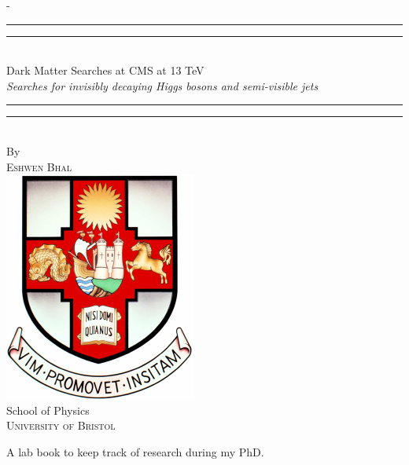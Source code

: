 \documentclass[a4paper,12pt,leqno,openbib,oldfontcommands,oneside]{memoir} %
\begin{document}
\frontmatter
{}

\begin{titlingpage}
  \begin{SingleSpace}
  \calccentering{\unitlength} 
  \begin{adjustwidth*}{\unitlength}{-\unitlength}
  \vspace*{13mm}
  \begin{center}
  \rule[0.5ex]{\linewidth}{2pt}\vspace*{-\baselineskip}\vspace*{3.2pt}
  \rule[0.5ex]{\linewidth}{1pt}\\[\baselineskip]
  {\HUGE Dark Matter Searches at CMS at 13 TeV}\\[4mm] %
  {\Large \textit{Searches for invisibly decaying Higgs bosons and semi-visible jets}}\\ %
  \rule[0.5ex]{\linewidth}{1pt}\vspace*{-\baselineskip}\vspace{3.2pt}
  \rule[0.5ex]{\linewidth}{2pt}\\
  \vspace{6.5mm}
  {\large By}\\
  \vspace{6.5mm}
  {\large\textsc{Eshwen Bhal}}\\  %
  \vspace{11mm}
  \includegraphics[scale=0.6]{headers/bristolcrest_colour}\\  %
  \vspace{6mm}
  {\large School of Physics\\  %
  \textsc{University of Bristol}}\\  %
  \vspace{11mm}
  \begin{minipage}{10cm}
  A lab book to keep track of research during my PhD.
  

\end{minipage}
\end{center}
\end{adjustwidth*}
\end{SingleSpace}
\end{titlingpage}
\end{document}
